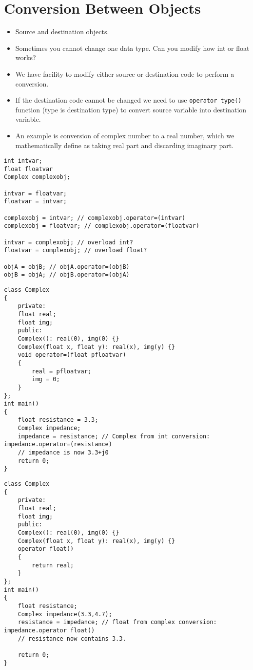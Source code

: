 \documentclass[12pt,a4paper]{article}
\begin{document}
\section{Conversion Between Objects}
\begin{itemize}
\item Source and destination objects.
\item Sometimes you cannot change one data type. Can you modify how int or float works?
\item We have facility to modify either source or destination code to perform a conversion.
\item If the destination code cannot be changed we need to use \verb|operator type()| function (type is destination type) to convert source variable into destination variable.
\item An example is conversion of complex number to a real number, which we mathematically define as taking real part and discarding imaginary part.
\end{itemize}
\begin{lstlisting}[caption={Conversion Between Objects}]
int intvar;
float floatvar
Complex complexobj;

intvar = floatvar;
floatvar = intvar;

complexobj = intvar; // complexobj.operator=(intvar)
complexobj = floatvar; // complexobj.operator=(floatvar)

intvar = complexobj; // overload int?
floatvar = complexobj; // overload float?

objA = objB; // objA.operator=(objB)
objB = objA; // objB.operator=(objA)
\end{lstlisting}
\begin{lstlisting}[caption={Object from Float}]
class Complex
{
	private:
	float real;
	float img;
	public:
	Complex(): real(0), img(0) {}
	Complex(float x, float y): real(x), img(y) {}
	void operator=(float pfloatvar)
	{
		real = pfloatvar;
		img = 0;
	}
};
int main()
{
	float resistance = 3.3;
	Complex impedance;
	impedance = resistance; // Complex from int conversion: impedance.operator=(resistance)
	// impedance is now 3.3+j0
	return 0;
}
\end{lstlisting}
\begin{lstlisting}[caption={Float from Object}]
class Complex
{
	private:
	float real;
	float img;
	public:
	Complex(): real(0), img(0) {}
	Complex(float x, float y): real(x), img(y) {}
	operator float()
	{
		return real;
	}
};
int main()
{
	float resistance;
	Complex impedance(3.3,4.7);
	resistance = impedance; // float from complex conversion: impedance.operator float()
	// resistance now contains 3.3.

	return 0;
}
\end{lstlisting}
\end{document}
